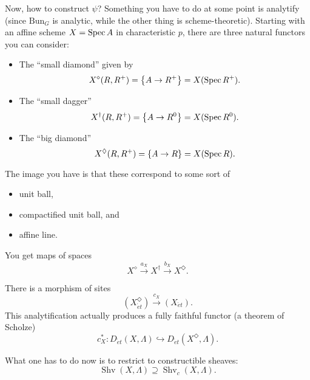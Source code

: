 \documentclass[reqno]{amsart} 
\begin{document}
Now, how to construct $\psi$?  Something you have to do at some point is analytify (since $\mathrm{Bun}_G$ is analytic, while the other thing is scheme-theoretic).  Starting with an affine scheme $X = \operatorname{Spec} A$ in characteristic $p$, there are three natural functors you can consider:
\begin{itemize}
\item The ``small diamond'' given by
  \begin{equation*}
    X^{\diamond}(R, R^+) = \left\{ A \rightarrow R^+ \right\} =X(\operatorname{Spec} R^+).
  \end{equation*}
\item The ``small dagger''
  \begin{equation*}
    X^{\dagger}(R, R^+) = \left\{ A \rightarrow R^0 \right\} = X(\operatorname{Spec} R^0).
  \end{equation*}
\item The ``big diamond''
  \begin{equation*}
    X^{\Diamond}(R, R^+) = \left\{ A \rightarrow R \right\} = X(\operatorname{Spec} R).
  \end{equation*}
\end{itemize}
The image you have is that these correspond to some sort of
\begin{itemize}
\item unit ball, 
\item compactified unit ball, and
\item affine line.
\end{itemize}

You get maps of spaces
\begin{equation*}
  X^{\diamond} \xrightarrow{a_X} X^{\dagger} \xrightarrow{b_X} X^{\Diamond}.
\end{equation*}

There is a morphism of sites
\begin{equation*}
  \left( X_{\acute{e}t}^{\Diamond} \right) \xrightarrow{c_X} \left( X_{\acute{e}t} \right).
\end{equation*}
This analytification actually produces a fully faithful functor (a theorem of Scholze)
\begin{equation*}
  c_X^\ast : D_{\acute{e}t}(X, \Lambda) \hookrightarrow D_{\acute{e}t}(X^{\Diamond}, \Lambda).
\end{equation*}

What one has to do now is to restrict to constructible sheaves:
\begin{equation*}
  \operatorname{Shv}(X, \Lambda) \supseteq \operatorname{Shv}_c(X, \Lambda).
\end{equation*}
\end{document}
